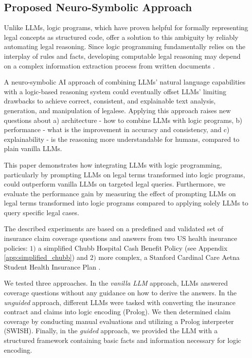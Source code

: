 \subsection{Proposed Neuro-Symbolic Approach}
Unlike LLMs, logic programs, which have proven helpful for formally representing legal concepts as structured code, offer a solution to this ambiguity by reliably automating legal reasoning. Since logic programming fundamentally relies on the interplay of rules and facts, developing computable legal reasoning may depend on a complex information extraction process from written documents \cite{wang-pan-2020, aitken-2002}. 

A neuro-symbolic AI approach of combining LLMs' natural language capabilities with a logic-based reasoning system could eventually offset LLMs' limiting drawbacks to achieve correct, consistent, and explainable text analysis, generation, and manipulation of legalese. Applying this approach raises new questions about a) architecture - how to combine LLMs with logic programs, b) performance - what is the improvement in accuracy and consistency, and c) explainability - is the reasoning more understandable for humans, compared to plain vanilla LLMs. 

This paper demonstrates how integrating LLMs with logic programming, particularly by prompting LLMs on legal terms transformed into logic programs, could outperform vanilla LLMs on targeted legal queries. Furthermore, we evaluate the performance gain by measuring the effect of prompting LLMs on legal terms transformed into logic programs compared to applying solely LLMs to query specific legal cases.

The described experiments are based on a predefined and validated set of insurance claim coverage questions and answers from two US health insurance policies: $1)$ a simplified Chubb Hospital Cash Benefit Policy (see Appendix \ref{app:simplified_chubb}) and $2)$ more complex, a Stanford Cardinal Care Aetna Student Health Insurance Plan \cite{aetna2024}.

We tested three approaches. In the \textit{vanilla LLM} approach, LLMs answered coverage questions without any guidance on how to derive the answers. In the \textit{unguided} approach, different LLMs were tasked with converting the insurance contract and claims into logic encoding (Prolog). We then determined claim coverage by conducting manual evaluations and utilizing a Prolog interpreter (SWISH). Finally, in the \textit{guided} approach, we provided the LLM with a structured framework containing basic facts and information necessary for logic encoding.

